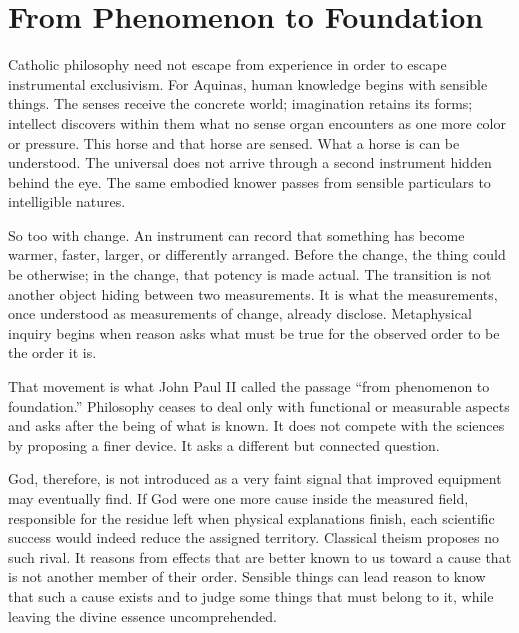 \section{From Phenomenon to Foundation}

Catholic philosophy need not escape from experience in order to escape instrumental exclusivism. For Aquinas, human knowledge begins with sensible things. The senses receive the concrete world; imagination retains its forms; intellect discovers within them what no sense organ encounters as one more color or pressure. This horse and that horse are sensed. What a horse is can be understood. The universal does not arrive through a second instrument hidden behind the eye. The same embodied knower passes from sensible particulars to intelligible natures.

So too with change. An instrument can record that something has become warmer, faster, larger, or differently arranged. Before the change, the thing could be otherwise; in the change, that potency is made actual. The transition is not another object hiding between two measurements. It is what the measurements, once understood as measurements of change, already disclose. Metaphysical inquiry begins when reason asks what must be true for the observed order to be the order it is.

That movement is what John Paul II called the passage ``from phenomenon to foundation.'' Philosophy ceases to deal only with functional or measurable aspects and asks after the being of what is known. It does not compete with the sciences by proposing a finer device. It asks a different but connected question.

God, therefore, is not introduced as a very faint signal that improved equipment may eventually find. If God were one more cause inside the measured field, responsible for the residue left when physical explanations finish, each scientific success would indeed reduce the assigned territory. Classical theism proposes no such rival. It reasons from effects that are better known to us toward a cause that is not another member of their order. Sensible things can lead reason to know that such a cause exists and to judge some things that must belong to it, while leaving the divine essence uncomprehended.

